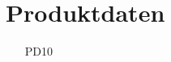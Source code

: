\documentclass[a4paper,12pt]{article}
\begin{document}

















\section{Produktdaten}
\begin{itemize}[nosep]
\leftskip=0.5cm
\item[PD10]
\end{itemize}





\end{document}
